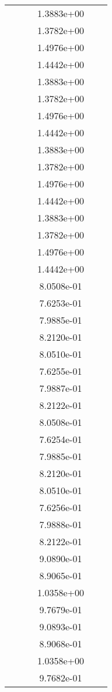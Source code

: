 \begin{xltabular}{\textwidth}{r|rS[table-format=1.3e+2]S[table-format=1.4e+2]S[table-format=1.4e+2]S[table-format=-1.5]}
&  &  & 1.3883e+00 & & \\
&  &  & 1.3782e+00 & & \\
&  &  & 1.4976e+00 & & \\
&  &  & 1.4442e+00 & & \\
&  &  & 1.3883e+00 & & \\
&  &  & 1.3782e+00 & & \\
&  &  & 1.4976e+00 & & \\
&  &  & 1.4442e+00 & & \\
&  &  & 1.3883e+00 & & \\
&  &  & 1.3782e+00 & & \\
&  &  & 1.4976e+00 & & \\
&  &  & 1.4442e+00 & & \\
&  &  & 1.3883e+00 & & \\
&  &  & 1.3782e+00 & & \\
&  &  & 1.4976e+00 & & \\
&  &  & 1.4442e+00 & & \\
&  &  & 8.0508e-01 & & \\
&  &  & 7.6253e-01 & & \\
&  &  & 7.9885e-01 & & \\
&  &  & 8.2120e-01 & & \\
&  &  & 8.0510e-01 & & \\
&  &  & 7.6255e-01 & & \\
&  &  & 7.9887e-01 & & \\
&  &  & 8.2122e-01 & & \\
&  &  & 8.0508e-01 & & \\
&  &  & 7.6254e-01 & & \\
&  &  & 7.9885e-01 & & \\
&  &  & 8.2120e-01 & & \\
&  &  & 8.0510e-01 & & \\
&  &  & 7.6256e-01 & & \\
&  &  & 7.9888e-01 & & \\
&  &  & 8.2122e-01 & & \\
&  &  & 9.0890e-01 & & \\
&  &  & 8.9065e-01 & & \\
&  &  & 1.0358e+00 & & \\
&  &  & 9.7679e-01 & & \\
&  &  & 9.0893e-01 & & \\
&  &  & 8.9068e-01 & & \\
&  &  & 1.0358e+00 & & \\
&  &  & 9.7682e-01 & & \\

\end{xltabular}
